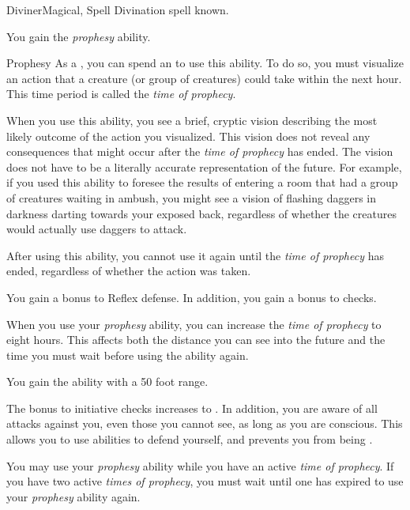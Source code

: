     \begin{feat}{Diviner}{Magical, Spell}
        \featpre Divination spell known.

         You gain the \textit{prophesy} ability.
        \begin{ability}{Prophesy}
            As a , you can spend an  to use this ability.
            To do so, you must visualize an action that a creature (or group of creatures) could take within the next hour.
            This time period is called the \textit{time of prophecy}.

            When you use this ability, you see a brief, cryptic vision describing the most likely outcome of the action you visualized.
            This vision does not reveal any consequences that might occur after the \textit{time of prophecy} has ended.
            The vision does not have to be a literally accurate representation of the future.
            For example, if you used this ability to foresee the results of entering a room that had a group of creatures waiting in ambush, you might see a vision of flashing daggers in darkness darting towards your exposed back, regardless of whether the creatures would actually use daggers to attack.

            After using this ability, you cannot use it again until the \textit{time of prophecy} has ended, regardless of whether the action was taken.
        \end{ability}

         You gain a  bonus to Reflex defense.
        In addition, you gain a  bonus to  checks.

         When you use your \textit{prophesy} ability, you can increase the \textit{time of prophecy} to eight hours.
        This affects both the distance you can see into the future and the time you must wait before using the ability again.

         You gain the  ability with a 50 foot range.

         The bonus to initiative checks increases to .
        In addition, you are aware of all attacks against you, even those you cannot see, as long as you are conscious.
        This allows you to use abilities to defend yourself, and prevents you from being \unaware.

         You may use your \textit{prophesy} ability while you have an active \textit{time of prophecy}.
        If you have two active \textit{times of prophecy}, you must wait until one has expired to use your \textit{prophesy} ability again.


\end{feat}
